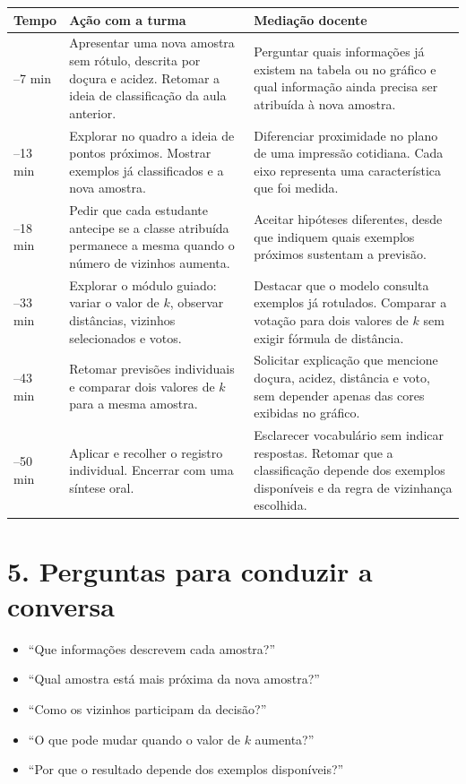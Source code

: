 \documentclass[12pt,a4paper]{article}
\begin{document}
\renewcommand{\arraystretch}{1.22}
\begin{tabularx}{\linewidth}{|>{\centering\arraybackslash}p{1.65cm}|p{5.0cm}|X|}
\hline
\textbf{Tempo} & \textbf{Ação com a turma} & \textbf{Mediação docente} \\
\hline
0--7 min & Apresentar uma nova amostra sem rótulo, descrita por doçura e acidez. Retomar a ideia de classificação da aula anterior. & Perguntar quais informações já existem na tabela ou no gráfico e qual informação ainda precisa ser atribuída à nova amostra. \\
\hline
7--13 min & Explorar no quadro a ideia de pontos próximos. Mostrar exemplos já classificados e a nova amostra. & Diferenciar proximidade no plano de uma impressão cotidiana. Cada eixo representa uma característica que foi medida. \\
\hline
13--18 min & Pedir que cada estudante antecipe se a classe atribuída permanece a mesma quando o número de vizinhos aumenta. & Aceitar hipóteses diferentes, desde que indiquem quais exemplos próximos sustentam a previsão. \\
\hline
18--33 min & Explorar o módulo guiado: variar o valor de $k$, observar distâncias, vizinhos selecionados e votos. & Destacar que o modelo consulta exemplos já rotulados. Comparar a votação para dois valores de $k$ sem exigir fórmula de distância. \\
\hline
33--43 min & Retomar previsões individuais e comparar dois valores de $k$ para a mesma amostra. & Solicitar explicação que mencione doçura, acidez, distância e voto, sem depender apenas das cores exibidas no gráfico. \\
\hline
43--50 min & Aplicar e recolher o registro individual. Encerrar com uma síntese oral. & Esclarecer vocabulário sem indicar respostas. Retomar que a classificação depende dos exemplos disponíveis e da regra de vizinhança escolhida. \\
\hline
\end{tabularx}

\section*{5. Perguntas para conduzir a conversa}

\begin{itemize}
  \item ``Que informações descrevem cada amostra?''
  \item ``Qual amostra está mais próxima da nova amostra?''
  \item ``Como os vizinhos participam da decisão?''
  \item ``O que pode mudar quando o valor de $k$ aumenta?''
  \item ``Por que o resultado depende dos exemplos disponíveis?''
\end{itemize}
\end{document}
